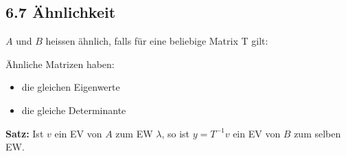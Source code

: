 \subsection{6.7 Ähnlichkeit}{
\vskip1pt
$A$ und $B$ heissen ähnlich, falls für eine beliebige Matrix T gilt: 

\begin{center}
\end{center}
\par


Ähnliche Matrizen haben:
\begin{itemize}[leftmargin=0.29cm, itemsep=0.5pt]
\item die gleichen Eigenwerte
\item die gleiche Determinante
\end{itemize}

\vskip4pt

\textbf{Satz:} Ist $v$ ein EV von $A$ zum EW $\lambda$, so ist $y = T^{-1}v$ ein EV von $B$ zum selben EW.

}
\WhiteSpace